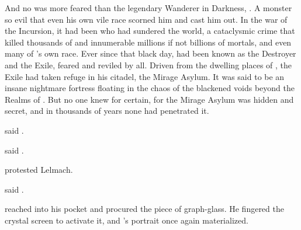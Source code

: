 And no \dragon was more feared than the legendary Wanderer in Darkness, \QuessanthIshnaruchaefir. 
A monster so evil that even his own vile race scorned him and cast him out. 
In the war of the Incursion, it had been \Ishnaruchaefir who had sundered the world, a cataclysmic crime that killed thousands of \resphain and innumerable millions if not billions of mortals, and even many of \Ishnaruchaefir's own race. 
Ever since that black day, \Ishnaruchaefir had been known as the Destroyer and the Exile, feared and reviled by all. 
Driven from the dwelling places of \dragonkind, the Exile had taken refuge in his citadel, the Mirage Asylum. 
It was said to be an insane nightmare fortress floating in the chaos of the blackened voids beyond the Realms of \Miith. 
But no one knew for certain, for the Mirage Asylum was hidden and secret, and in thousands of years none had penetrated it.

 said \Teshrial. 

 said \Ganethed.

 protested Lelmach.

 said \Achsah.



\begin{comment}
  \subsection{Teshrial volunteers}
\end{comment}
\Teshrial reached into his pocket and procured the piece of graph-glass. 
He fingered the crystal screen to activate it, and \Firaxel's portrait once again materialized. 


